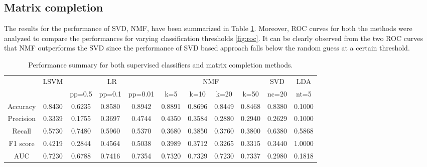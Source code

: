 \documentclass{article} %
\begin{document}
\subsection{Matrix completion}

The results for the performance of SVD, NMF, have been summarized in Table \ref{tab:standardresults}. Moreover, ROC curves for both the methods were analyzed to compare the performances for varying classification thresholds \ref{fig:roc}. It can be clearly observed from the two ROC curves that NMF outperforms the SVD since the performance of SVD based approach falls below the random guess at a certain threshold.

\begin{table}
\centering
{
\fontsize{8 }{14}\selectfont
\noindent\begin{tabular}{ c | c | c c c | c c c c | c | c }
	\hline
	    & \multirow{2}{*}{LSVM}
	    & \multicolumn{3}{c|}{LR}
	    & \multicolumn{4}{c|}{NMF}
	    & \multicolumn{1}{c|}{SVD}
	    & \multicolumn{1}{c}{LDA}\\
	\cline{3-11}
    & & pp=0.5 & pp=0.1 & pp=0.01 & k=5 & k=10 & k=20 & k=50 & nc=20 & nt=5 \\
	\hline
	\hline
	Accuracy  & 0.8430 & 0.6235 & 0.8580 & 0.8942 & 0.8891 & 0.8696 & 0.8449 & 0.8468 & 0.8380 & 0.1000 \\
	\hline
	Precision & 0.3339 & 0.1755 & 0.3697 & 0.4744 & 0.4350 & 0.3584 & 0.2880 & 0.2940 & 0.2629 & 0.1000 \\
	\hline
	Recall    & 0.5730 & 0.7480 & 0.5960 & 0.5370 & 0.3680 & 0.3850 & 0.3760 & 0.3800 & 0.6380 & 0.5868 \\
	\hline
	F1 score  & 0.4219 & 0.2844 & 0.4564 & 0.5038 & 0.3989 & 0.3712 & 0.3265 & 0.3315 & 0.3440 & 1.0000 \\
	\hline
	AUC       & 0.7230 & 0.6788 & 0.7416 & 0.7354 & 0.7320 & 0.7329 & 0.7230 & 0.7337 & 0.2980 & 0.1818 \\
	\hline
\end{tabular}
}
\caption{\small Performance summary for both supervised classifiers and matrix completion methods.}
\label{tab:standardresults}
\end{table}
\end{document}
